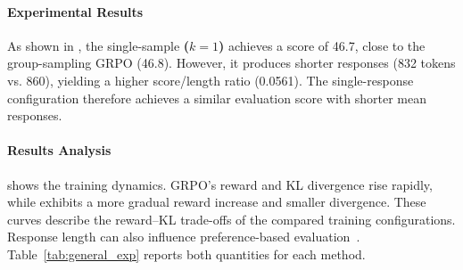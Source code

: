 \paragraph{Experimental Results}
As shown in , the single-sample \textbf{\ours ($k=1$)} achieves a score of 46.7, close to the group-sampling GRPO (46.8). However, it produces shorter responses (832 tokens vs. 860), yielding a higher score/length ratio (0.0561). The single-response configuration therefore achieves a similar evaluation score with shorter mean responses.

\paragraph{Results Analysis}
 shows the training dynamics. GRPO's reward and KL divergence rise rapidly, while \ours exhibits a more gradual reward increase and smaller divergence. These curves describe the reward--KL trade-offs of the compared training configurations. Response length can also influence preference-based evaluation~\citep{dubois2024length}. Table~\ref{tab:general_exp} reports both quantities for each method.




